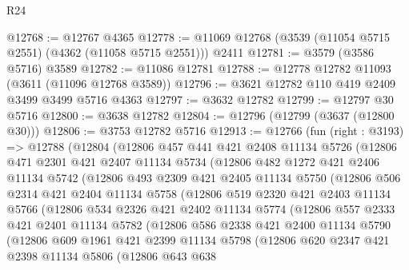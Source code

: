 \begin{lexlean}{R24}
\begin{coremodule}
@12768 := @12767 @4365
@12778 := @11069 @12768 (@3539 (@11054 @5715 @2551) (@4362 (@11058 @5715 @2551))) @2411
@12781 := @3579 (@3586 @5716) @3589
@12782 := @11086 @12781
@12788 := @12778 @12782 @11093 (@3611 (@11096 @12768 @3589))
@12796 := @3621 @12782 @110 @419 @2409 @3499 @3499 @5716 @4363
@12797 := @3632 @12782
@12799 := @12797 @30 @5716
@12800 := @3638 @12782
@12804 := @12796 (@12799 (@3637 (@12800 @30)))
@12806 := @3753 @12782 @5716
@12913 := @12766
    (fun (right : @3193) =>
    @12788
      (@12804
        (@12806
          @457
          @441
          @421
          @2408
          @11134
          @5726
          (@12806
            @471
            @2301
            @421
            @2407
            @11134
            @5734
            (@12806
              @482
              @1272
              @421
              @2406
              @11134
              @5742
              (@12806
                @493
                @2309
                @421
                @2405
                @11134
                @5750
                (@12806
                  @506
                  @2314
                  @421
                  @2404
                  @11134
                  @5758
                  (@12806
                    @519
                    @2320
                    @421
                    @2403
                    @11134
                    @5766
                    (@12806
                      @534
                      @2326
                      @421
                      @2402
                      @11134
                      @5774
                      (@12806
                        @557
                        @2333
                        @421
                        @2401
                        @11134
                        @5782
                        (@12806
                          @586
                          @2338
                          @421
                          @2400
                          @11134
                          @5790
                          (@12806
                            @609
                            @1961
                            @421
                            @2399
                            @11134
                            @5798
                            (@12806
                              @620
                              @2347
                              @421
                              @2398
                              @11134
                              @5806
                              (@12806
                                @643
                                @638

\end{coremodule}
\end{lexlean}
